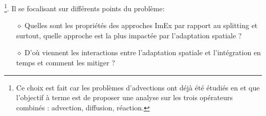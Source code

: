     \footnote{Ce choix est fait car les problèmes d'advections ont déjà été étudiés en \cite{belloti_et_al_2025} et que l'objectif à terme est de proposer une analyse
    sur les trois opérateurs combinés : advection, diffusion, réaction.}. Il se focalisant sur différents points du problème:
    \begin{enumerate}
        \item[$\diamond$] Quelles sont les propriétés des approches ImEx par rapport au splitting et surtout, quelle approche est la plus impactée par l'adaptation spatiale ?
        \item[$\diamond$] D'où viennent les interactions entre l'adaptation spatiale et l'intégration en temps et comment les mitiger ?
    \end{enumerate}
